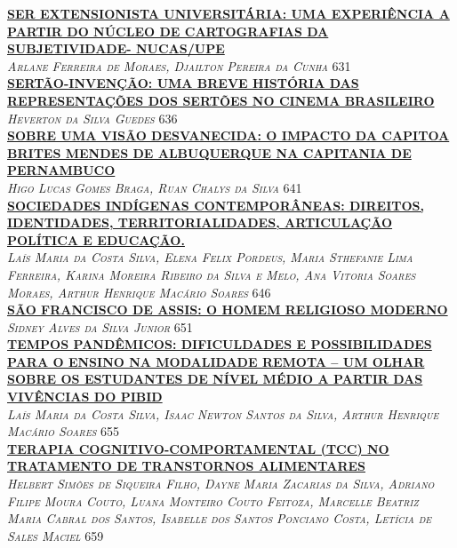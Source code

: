 \noindent \textsc{\hyperlink{trabalhos/251672.pdf.1}{\textbf{SER EXTENSIONISTA UNIVERSITÁRIA: UMA EXPERIÊNCIA A PARTIR DO NÚCLEO DE CARTOGRAFIAS DA SUBJETIVIDADE-  NUCAS/UPE}}}\\ 
\noindent \textsc{\textit{Arlane Ferreira de Moraes, Djailton Pereira da Cunha}} \hfill 631\\ 

\noindent \textsc{\hyperlink{trabalhos/250915.pdf.1}{\textbf{SERTÃO-INVENÇÃO: UMA BREVE HISTÓRIA DAS REPRESENTAÇÕES DOS SERTÕES NO CINEMA BRASILEIRO}}}\\ 
\noindent \textsc{\textit{Heverton da Silva Guedes}} \hfill 636\\ 

\noindent \textsc{\hyperlink{trabalhos/249676.pdf.1}{\textbf{SOBRE UMA VISÃO DESVANECIDA: O IMPACTO DA CAPITOA BRITES MENDES DE ALBUQUERQUE NA CAPITANIA DE PERNAMBUCO}}}\\ 
\noindent \textsc{\textit{Higo Lucas Gomes Braga, Ruan Chalys da Silva}} \hfill 641\\ 

\noindent \textsc{\hyperlink{trabalhos/251465.pdf.1}{\textbf{SOCIEDADES INDÍGENAS CONTEMPORÂNEAS: DIREITOS, IDENTIDADES, TERRITORIALIDADES, ARTICULAÇÃO POLÍTICA E EDUCAÇÃO.}}}\\ 
\noindent \textsc{\textit{Laís Maria da Costa Silva, Elena Felix Pordeus, Maria Sthefanie Lima Ferreira, Karina Moreira Ribeiro da Silva e Melo, Ana Vitoria Soares Moraes, Arthur Henrique Macário Soares}} \hfill 646\\ 

\noindent \textsc{\hyperlink{trabalhos/250162.pdf.1}{\textbf{SÃO FRANCISCO DE ASSIS: O HOMEM RELIGIOSO MODERNO}}}\\ 
\noindent \textsc{\textit{Sidney Alves da Silva Junior}} \hfill 651\\ 

\noindent \textsc{\hyperlink{trabalhos/251101.pdf.1}{\textbf{TEMPOS PANDÊMICOS: DIFICULDADES E POSSIBILIDADES PARA O ENSINO NA MODALIDADE REMOTA – UM OLHAR SOBRE OS ESTUDANTES DE NÍVEL MÉDIO A PARTIR DAS VIVÊNCIAS DO PIBID}}}\\ 
\noindent \textsc{\textit{Laís Maria da Costa Silva, Isaac Newton Santos da Silva, Arthur Henrique Macário Soares}} \hfill 655\\ 

\noindent \textsc{\hyperlink{trabalhos/250297.pdf.1}{\textbf{TERAPIA COGNITIVO-COMPORTAMENTAL (TCC) NO TRATAMENTO DE TRANSTORNOS ALIMENTARES}}}\\ 
\noindent \textsc{\textit{Helbert Simões de Siqueira Filho, Dayne Maria Zacarias da Silva, Adriano Filipe Moura Couto, Luana Monteiro Couto Feitoza, Marcelle Beatriz Maria Cabral dos Santos, Isabelle dos Santos Ponciano Costa, Letícia de Sales Maciel}} \hfill 659\\ 

